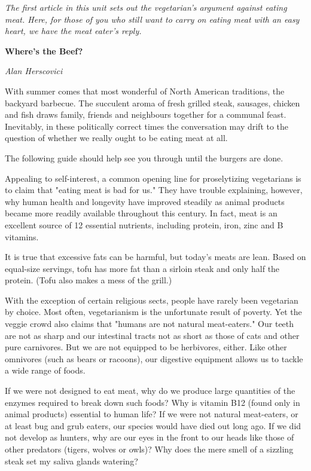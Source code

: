 \documentclass[a4paper]{article}
\title{}
\author{}
\date{}
\begin{document}
\maketitle
\textsf{\textsl{The first article in this unit sets out the vegetarian's argument against eating meat. Here, for those of you who still want to carry on eating meat with an easy heart, we have the meat eater's reply.}}

\begin{center}
\textbf{ \huge Where's the Beef?}
\end{center}


\begin{flushright}
\textsf{\textit{Alan Herscovici}}
\end{flushright}

With summer comes that most wonderful of North American traditions, the backyard barbecue. The succulent aroma of fresh grilled steak, sausages, chicken and fish draws family, friends and neighbours together for a communal feast. Inevitably, in these politically correct times the conversation may drift to the question of whether we really ought to be eating meat at all.

The following guide should help see you through until the burgers are done.

Appealing to self-interest, a common opening line for proselytizing vegetarians is to claim that "eating meat is bad for us." They have trouble explaining, however, why human health and longevity have improved steadily as animal products became more readily available throughout this century. In fact, meat is an excellent source of 12 essential nutrients, including protein, iron, zinc and B vitamins.

 It is true that excessive fats can be harmful, but today's meats are lean. Based on equal-size servings, tofu has more fat than a sirloin steak and only half the protein. (Tofu also makes a mess of the grill.)

With the exception of certain religious sects, people have rarely been vegetarian by choice. Most often, vegetarianism is the unfortunate result of poverty. Yet the veggie crowd also claims that "humans are not natural meat-eaters." Our teeth are not as sharp and our intestinal tracts not as short as those of cats and other pure carnivores. But we are not equipped to be herbivores, either. Like other omnivores (such as bears or racoons), our digestive equipment allows us to tackle a wide range of foods.

If we were not designed to eat meat, why do we produce large quantities of the enzymes required to break down such foods? Why is vitamin B12 (found only in animal products) essential to human life? If we were not natural meat-eaters, or at least bug and grub eaters, our species would have died out long ago. If we did not develop as hunters, why are our eyes in the front to our heads like those of other predators (tigers, wolves or owls)? Why does the mere smell of a sizzling steak set my saliva glands watering?
\end{document}
